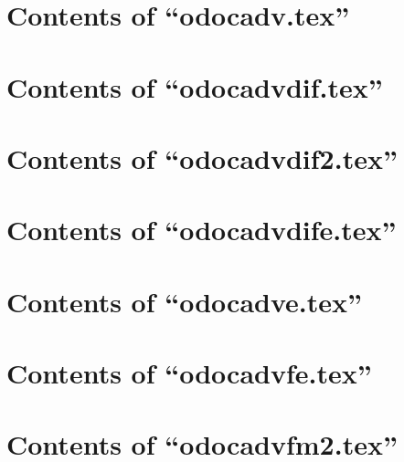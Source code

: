 \section{Contents of ``odocadv.tex''}

\begin{itemize}

\end{itemize}

\section{Contents of ``odocadvdif.tex''}

\begin{itemize}

\end{itemize}

\section{Contents of ``odocadvdif2.tex''}

\begin{itemize}

\end{itemize}

\section{Contents of ``odocadvdife.tex''}

\begin{itemize}

\end{itemize}

\section{Contents of ``odocadve.tex''}

\begin{itemize}

\end{itemize}

\section{Contents of ``odocadvfe.tex''}

\begin{itemize}

\end{itemize}

\section{Contents of ``odocadvfm2.tex''}

